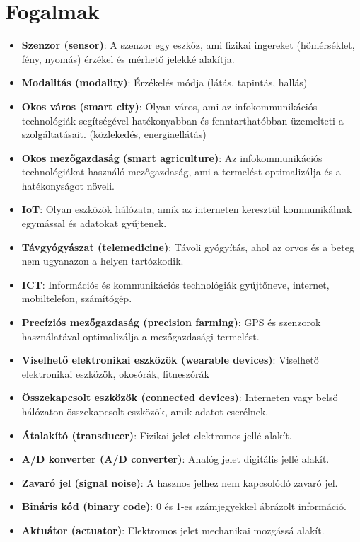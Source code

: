 \section{Fogalmak}
\begin{itemize}
    \item \textbf{Szenzor (sensor)}: A szenzor egy eszköz, ami fizikai ingereket (hőmérséklet, fény, nyomás) érzékel és mérhető jelekké alakítja.
    \item \textbf{Modalitás (modality)}: Érzékelés módja (látás, tapintás, hallás)
    \item \textbf{Okos város (smart city)}: Olyan város, ami az infokommunikációs technológiák segítségével hatékonyabban és fenntarthatóbban üzemelteti a szolgáltatásait. (közlekedés, energiaellátás)
    \item \textbf{Okos mezőgazdaság (smart agriculture)}: Az infokommunikációs technológiákat használó mezőgazdaság, ami a termelést optimalizálja és a hatékonyságot növeli.
    \item \textbf{IoT}: Olyan eszközök hálózata, amik az interneten keresztül kommunikálnak egymással és adatokat gyűjtenek.
    \item \textbf{Távgyógyászat (telemedicine)}: Távoli gyógyítás, ahol az orvos és a beteg nem ugyanazon a helyen tartózkodik.
    \item \textbf{ICT}: Információs és kommunikációs technológiák gyűjtőneve, internet, mobiltelefon, számítógép.
    \item \textbf{Precíziós mezőgazdaság (precision farming)}: GPS és szenzorok használatával optimalizálja a mezőgazdasági termelést.
    \item \textbf{Viselhető elektronikai eszközök (wearable devices)}: Viselhető elektronikai eszközök, okosórák, fitneszórák
    \item \textbf{Összekapcsolt eszközök (connected devices)}: Interneten vagy belső hálózaton összekapcsolt eszközök, amik adatot cserélnek.
    \item \textbf{Átalakító (transducer)}: Fizikai jelet elektromos jellé alakít.
    \item \textbf{A/D konverter (A/D converter)}: Analóg jelet digitális jellé alakít.
    \item \textbf{Zavaró jel (signal noise)}: A hasznos jelhez nem kapcsolódó zavaró jel.
    \item \textbf{Bináris kód (binary code)}: 0 és 1-es számjegyekkel ábrázolt információ.
    \item \textbf{Aktuátor (actuator)}: Elektromos jelet mechanikai mozgássá alakít.

\end{itemize}
